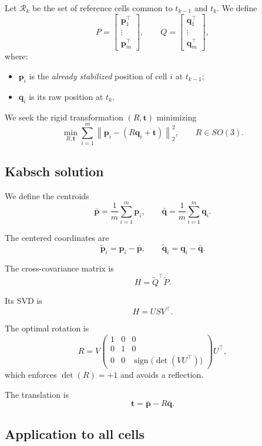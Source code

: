 \documentclass[11pt,a4paper]{article}
\begin{document}
Let $\mathcal{R}_k$ be the set of reference cells common to $t_{k-1}$ and $t_k$. We define
\[
P=
\begin{bmatrix}
\mathbf{p}_1^\top\\
\vdots\\
\mathbf{p}_m^\top
\end{bmatrix},
\qquad
Q=
\begin{bmatrix}
\mathbf{q}_1^\top\\
\vdots\\
\mathbf{q}_m^\top
\end{bmatrix},
\]
where:
\begin{itemize}
  \item $\mathbf{p}_i$ is the \emph{already stabilized} position of cell $i$ at $t_{k-1}$;
  \item $\mathbf{q}_i$ is its raw position at $t_k$.
\end{itemize}

We seek the rigid transformation $(R,\mathbf{t})$ minimizing
\[
\min_{R,\mathbf{t}} \sum_{i=1}^{m}\left\|
\mathbf{p}_i-(R\mathbf{q}_i+\mathbf{t})
\right\|_2^2,
\qquad
R\in SO(3).
\]

\subsection{Kabsch solution}

We define the centroids
\[
\bar{\mathbf{p}}=\frac{1}{m}\sum_{i=1}^{m}\mathbf{p}_i,
\qquad
\bar{\mathbf{q}}=\frac{1}{m}\sum_{i=1}^{m}\mathbf{q}_i.
\]

The centered coordinates are
\[
\tilde{\mathbf{p}}_i=\mathbf{p}_i-\bar{\mathbf{p}},
\qquad
\tilde{\mathbf{q}}_i=\mathbf{q}_i-\bar{\mathbf{q}}.
\]

The cross-covariance matrix is
\[
H=\tilde{Q}^\top \tilde{P}.
\]

Its SVD is
\[
H=USV^\top.
\]

The optimal rotation is
\[
R=V
\begin{pmatrix}
1&0&0\\
0&1&0\\
0&0&\operatorname{sign}\big(\det(VU^\top)\big)
\end{pmatrix}
U^\top,
\]
which enforces $\det(R)=+1$ and avoids a reflection.

The translation is
\[
\mathbf{t}=\bar{\mathbf{p}}-R\bar{\mathbf{q}}.
\]

\subsection{Application to all cells}
\end{document}
